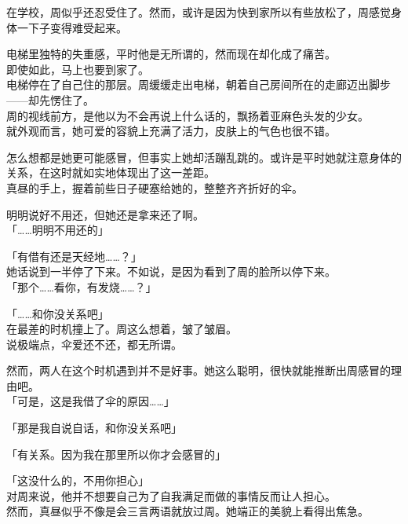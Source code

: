 在学校，周似乎还忍受住了。然而，或许是因为快到家所以有些放松了，周感觉身体一下子变得难受起来。

电梯里独特的失重感，平时他是无所谓的，然而现在却化成了痛苦。\\

即使如此，马上也要到家了。\\

电梯停在了自己住的那层。周缓缓走出电梯，朝着自己房间所在的走廊迈出脚步——却先愣住了。\\

周的视线前方，是他以为不会再说上什么话的，飘扬着亚麻色头发的少女。\\

就外观而言，她可爱的容貌上充满了活力，皮肤上的气色也很不错。

怎么想都是她更可能感冒，但事实上她却活蹦乱跳的。或许是平时她就注意身体的关系，在这时就如实地体现出了这一差距。\\

真昼的手上，握着前些日子硬塞给她的，整整齐齐折好的伞。

明明说好不用还，但她还是拿来还了啊。\\

「……明明不用还的」

「有借有还是天经地……？」\\

她话说到一半停了下来。不如说，是因为看到了周的脸所以停下来。\\

「那个……看你，有发烧……？」

「……和你没关系吧」\\

在最差的时机撞上了。周这么想着，皱了皱眉。\\

说极端点，伞爱还不还，都无所谓。

然而，两人在这个时机遇到并不是好事。她这么聪明，很快就能推断出周感冒的理由吧。\\

「可是，这是我借了伞的原因……」

「那是我自说自话，和你没关系吧」

「有关系。因为我在那里所以你才会感冒的」

「这没什么的，不用你担心」\\

对周来说，他并不想要自己为了自我满足而做的事情反而让人担心。\\

然而，真昼似乎不像是会三言两语就放过周。她端正的美貌上看得出焦急。\\

